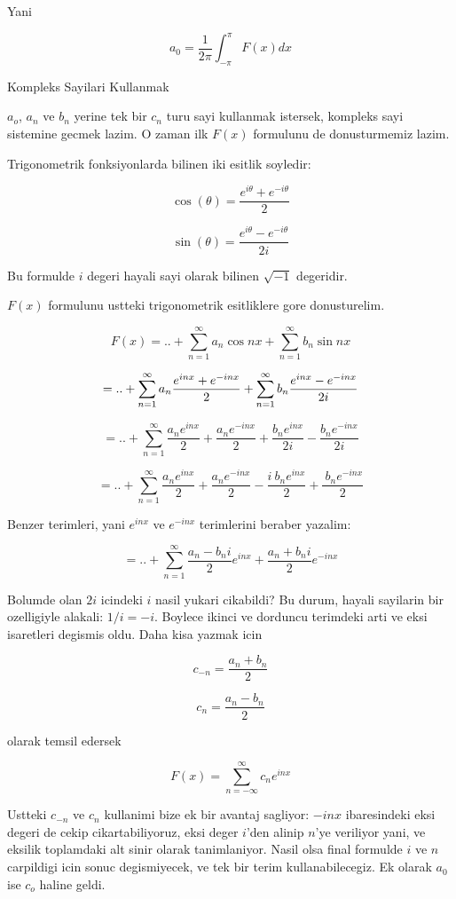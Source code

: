 \documentclass[12pt,fleqn]{article}\usepackage{../common}
\begin{document}
Yani

$$ a_0 = \frac{1}{2\pi}\int_{-\pi}^{\pi}F(x)dx $$

Kompleks Sayilari Kullanmak

$a_o$, $a_n$ ve $b_n$ yerine tek bir $c_n$ turu sayi kullanmak istersek,
kompleks sayi sistemine gecmek lazim. O zaman ilk $F(x)$ formulunu de
donusturmemiz lazim.

Trigonometrik fonksiyonlarda bilinen iki esitlik soyledir:

$$ \cos(\theta) = \frac{e^{i\theta}+e^{-i\theta}}{2} $$

$$ \sin(\theta) = \frac{e^{i\theta}-e^{-i\theta}}{2i}  $$

Bu formulde $i$ degeri hayali sayi olarak bilinen $\sqrt{-1}$ degeridir. 

$F(x)$ formulunu ustteki trigonometrik esitliklere gore donusturelim. 

$$ F(x) = .. +  \sum_{n=1}^{\infty}a_n \cos nx + \sum_{n=1}^{\infty}b_n \sin nx $$

$$ = .. + \sum_{n=1}^{\infty} a_n \frac{e^{inx} + e^{-inx}}{2} +  \sum_{n=1}^{\infty} b_n \frac{e^{inx} - e^{-inx}}{2i}\\ $$

$$ = .. + \sum_{n=1}^{\infty} \frac{a_ne^{inx}}{2} + \frac{a_ne^{-inx}}{2} +
\frac{b_ne^{inx}}{2i} - \frac{b_ne^{-inx}}{2i} $$

$$ = .. + \sum_{n=1}^{\infty} \frac{a_ne^{inx}}{2} + \frac{a_ne^{-inx}}{2} -
\frac{i \ b_ne^{inx}}{2} + \frac{ \ b_ne^{-inx}}{2} $$

Benzer terimleri, yani $e^{inx}$ ve $e^{-inx}$ terimlerini beraber yazalim:

$$ = .. + \sum_{n=1}^{\infty} \frac{a_n-b_ni}{2}e^{inx} + \frac{a_n+b_ni}{2}e^{-inx} $$

Bolumde olan $2i$ icindeki $i$ nasil yukari cikabildi? Bu durum, hayali
sayilarin bir ozelligiyle alakali: $1/i = -i$. Boylece ikinci ve dorduncu
terimdeki arti ve eksi isaretleri degismis oldu. Daha kisa yazmak icin

$$ c_{-n} = \frac{a_n + b_n}{2} $$

$$ c_{n} = \frac{a_n - b_n}{2} $$

olarak temsil edersek

$$F(x) = \sum_{n=-\infty}^{\infty} c_ne^{inx} $$

Ustteki $c_{-n}$ ve $c_n$ kullanimi bize ek bir avantaj sagliyor:
$-inx$ ibaresindeki eksi degeri de cekip cikartabiliyoruz, eksi deger
$i$'den alinip $n$'ye veriliyor yani, ve eksilik toplamdaki alt sinir
olarak tanimlaniyor. Nasil olsa final formulde $i$ ve $n$ carpildigi
icin sonuc degismiyecek, ve tek bir terim kullanabilecegiz. Ek olarak
$a_0$ ise $c_o$ haline geldi.
\end{document}
